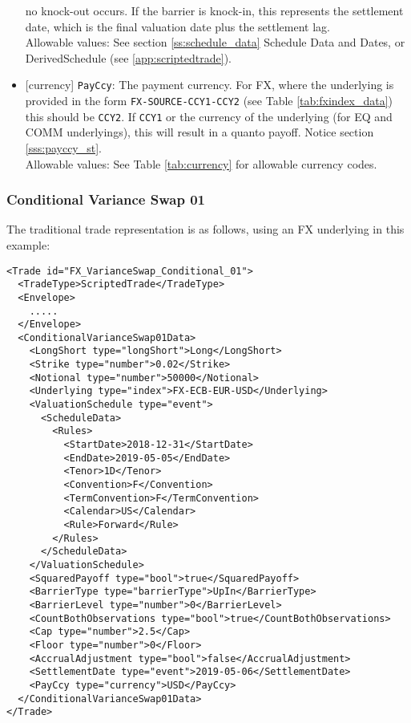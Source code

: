 \begin{itemize}
  no knock-out occurs. If the barrier is knock-in, this represents the settlement date, which is the final
  valuation date plus the settlement lag. \\
  Allowable values: See section \ref{ss:schedule_data} Schedule Data and Dates, or DerivedSchedule (see \ref{app:scriptedtrade}).
  \item{}[currency] \lstinline!PayCcy!: The payment currency. For FX, where the underlying is provided
      in the form \lstinline!FX-SOURCE-CCY1-CCY2! (see Table \ref{tab:fxindex_data}) this should
      be \lstinline!CCY2!. If \lstinline!CCY1! or the currency of the underlying (for EQ and
      COMM underlyings), this will result in a quanto payoff. Notice section \ref{sss:payccy_st}. \\
        Allowable values: See Table \ref{tab:currency}  for allowable currency codes.
\end{itemize}

\subsubsection*{Conditional Variance Swap 01}

The traditional trade representation is as follows, using an FX underlying in this example:

\begin{verbatim}
<Trade id="FX_VarianceSwap_Conditional_01">
  <TradeType>ScriptedTrade</TradeType>
  <Envelope>
    .....
  </Envelope>
  <ConditionalVarianceSwap01Data>
    <LongShort type="longShort">Long</LongShort>
    <Strike type="number">0.02</Strike>
    <Notional type="number">50000</Notional>
    <Underlying type="index">FX-ECB-EUR-USD</Underlying>
    <ValuationSchedule type="event">
      <ScheduleData>
        <Rules>
          <StartDate>2018-12-31</StartDate>
          <EndDate>2019-05-05</EndDate>
          <Tenor>1D</Tenor>
          <Convention>F</Convention>
          <TermConvention>F</TermConvention>
          <Calendar>US</Calendar>
          <Rule>Forward</Rule>
        </Rules>
      </ScheduleData>
    </ValuationSchedule>
    <SquaredPayoff type="bool">true</SquaredPayoff>
    <BarrierType type="barrierType">UpIn</BarrierType>
    <BarrierLevel type="number">0</BarrierLevel>
    <CountBothObservations type="bool">true</CountBothObservations>
    <Cap type="number">2.5</Cap>
    <Floor type="number">0</Floor>
    <AccrualAdjustment type="bool">false</AccrualAdjustment>
    <SettlementDate type="event">2019-05-06</SettlementDate>
    <PayCcy type="currency">USD</PayCcy>
  </ConditionalVarianceSwap01Data>
</Trade>
\end{verbatim}

